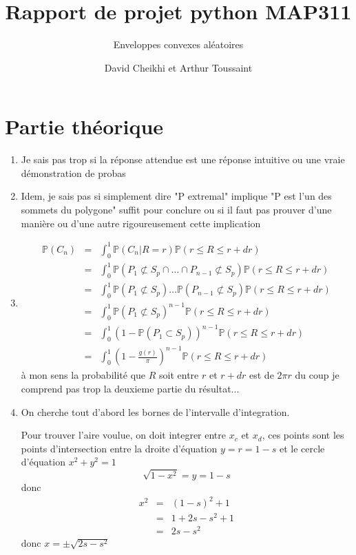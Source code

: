 \documentclass[a4paper,12pt,twoside]{article}
\title{Rapport de projet python MAP311}
\subtitle{Enveloppes convexes aléatoires}
\author{David Cheikhi et Arthur Toussaint}
\newcommand{\p}{\mathbb{P}}
\begin{document}
\maketitle

\section*{Partie théorique}
	\begin{enumerate}
		\item Je sais pas trop si la réponse attendue est une réponse intuitive ou une vraie démonstration de probas
		\item Idem, je sais pas si simplement dire "P extremal" implique "P est l'un des sommets du polygone" suffit pour conclure ou si il faut pas prouver d'une manière ou d'une autre rigoureusement cette implication
		\item \begin{eqnarray}
			\p(C_n) &=& \int_0^1{\p(C_n | R = r) \p(r\leq R \leq r + dr)} \\
				&=& \int_0^1{\p(P_1 \not\subset S_p \cap \ldots \cap P_{n-1} \not\subset S_p)\p(r\leq R \leq r + dr)} \\
				&=& \int_0^1{\p(P_1 \not\subset S_p) \ldots \p(P_{n-1} \not\subset S_p)\p(r\leq R \leq r + dr)} \\
				&=& \int_0^1{\p(P_1 \not\subset S_p)^{n-1}\p(r\leq R \leq r + dr)} \\
				&=& \int_0^1{(1 - \p(P_1 \subset S_p))^{n-1}\p(r\leq R \leq r + dr)} \\
				&=& \int_0^1{\left( 1 - \frac{g(r)}{\pi}\right) ^{n-1}\p(r\leq R \leq r + dr)}
		\end{eqnarray}
		à mon sens la probabilité que $R$ soit entre $r$ et $r + dr$ est de $2\pi r$ du coup je comprend pas trop la deuxieme partie du résultat...
		\item %
			On cherche tout d'abord les bornes de l'intervalle d'integration.

			Pour trouver l'aire voulue, on doit integrer entre $x_c$ et $x_d$, ces points sont les points d'intersection entre la droite d'équation $y = r = 1 - s$ et le cercle d'équation $x^2 + y^2 = 1$
			$$ \sqrt{1 - x^2} = y = 1 - s $$ donc 
			\begin{eqnarray}
				x^2	&=& (1 - s)^2 + 1\\
					&=& 1 + 2s - s^2 + 1\\
					&=& 2s - s^2
			\end{eqnarray} 
			donc $x = \pm \sqrt{2s - s^2}$


\end{enumerate}
\end{document}
